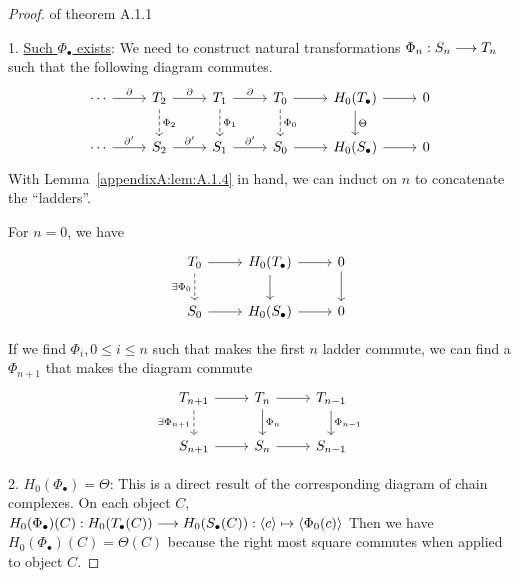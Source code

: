 \documentclass[11pt]{book} %
\begin{document}
\begin{proof}{of theorem A.1.1}

1. \underline{Such $\Phi_\bullet$ exists}: 
We need to construct natural transformations $\Phi_n:S_n\longrightarrow T_n$ such that the following diagram commutes.
\[\begin{tikzcd}
\cdots \arrow[r, "\pd"] & T_2 \arrow[r, "\pd"] \arrow[d, "\Phi_2", dashed] & T_1 \arrow[r, "\pd"] \arrow[d, "\Phi_1", dashed] & T_0 \arrow[r] \arrow[d, "\Phi_0", dashed] & H_0(T_\bullet) \arrow[r] \arrow[d, "\Theta"] & 0 \\
\cdots \arrow[r, "\pd'"] & S_2 \arrow[r, "\pd'"] & S_1 \arrow[r, "\pd'"] & S_0 \arrow[r] & H_0(S_\bullet) \arrow[r] & 0
\end{tikzcd}
\]
With Lemma~\ref{appendixA:lem:A.1.4} in hand, we can induct on $n$ to concatenate the ``ladders''.

For $n=0$, we have
\[
\begin{tikzcd}
T_0 \arrow[r] \arrow[d, "\exists \Phi_0"', dashed] & H_0(T_\bullet) \arrow[r] \arrow[d] & 0 \arrow[d] \\
S_0 \arrow[r] & H_0(S_\bullet) \arrow[r] & 0
\end{tikzcd}
\]


If we find $\Phi_i, 0\leq i\leq n$ such that makes the first $n$ ladder commute, we can find a $\Phi_{n+1}$ that makes the diagram commute
\[
\begin{tikzcd}
T_{n+1} \arrow[r] \arrow[d, "\exists \Phi_{n+1}"', dashed] & T_n \arrow[r] \arrow[d, "\Phi_n"] & T_{n-1} \arrow[d, "\Phi_{n-1}"] \\
S_{n+1} \arrow[r] & S_n \arrow[r] & S_{n-1}
\end{tikzcd}
\]

2. \underline{$H_0(\Phi_\bullet)=\Theta$}: This is a direct result of the corresponding diagram of  chain complexes. On each object $C$, $H_0(\Phi_\bullet)(C): H_0(T_\bullet(C))\longrightarrow H_0(S_\bullet(C)):\langle c\rangle\mapsto \langle \Phi_0(c)\rangle$
Then we have $H_0(\Phi_\bullet)(C)=\Theta(C)$ because the right most square commutes when applied to object $C$.


\end{proof}
\end{document}
